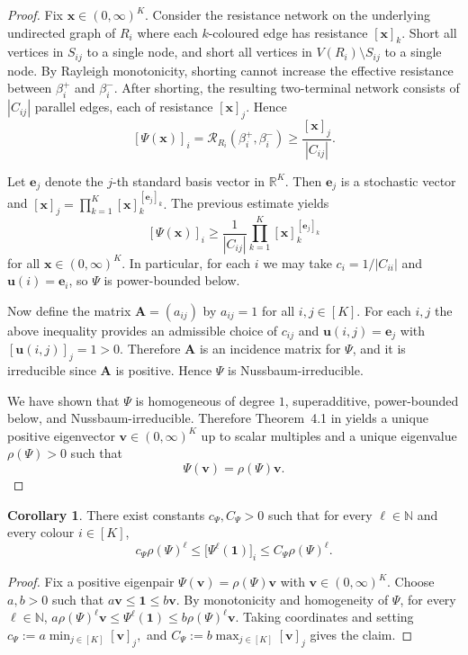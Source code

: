 \documentclass{article}
\theoremstyle{plain}
\theoremstyle{definition}
\newtheorem{corollary}[theorem]{Corollary}
\newcommand{\Reff}{\mathscr{R}}
\begin{document}
\begin{proof}
Fix $\mathbf x\in(0,\infty)^K$.
Consider the resistance network on the underlying undirected graph of $R_i$ where each $k$-coloured edge has resistance $[\mathbf x]_k$.
Short all vertices in $S_{ij}$ to a single node, and short all vertices in $V(R_i)\setminus S_{ij}$ to a single node.
By Rayleigh monotonicity, shorting cannot increase the effective resistance between $\beta_i^+$ and $\beta_i^-$.
After shorting, the resulting two-terminal network consists of $|C_{ij}|$ parallel edges, each of resistance $[\mathbf x]_j$.
Hence
\[
[\Psi(\mathbf x)]_i
=
\Reff_{R_i}(\beta_i^+,\beta_i^-)
\ge
\frac{[\mathbf x]_j}{|C_{ij}|}.
\]

Let $\mathbf e_j$ denote the $j$-th standard basis vector in $\mathbb R^K$.
Then $\mathbf e_j$ is a stochastic vector and
$
[\mathbf x]_j=\prod_{k=1}^K [\mathbf x]_k^{[\mathbf e_j]_k}.
$
The previous estimate yields
\[
[\Psi(\mathbf x)]_i
\ge
\frac{1}{|C_{ij}|}\prod_{k=1}^K [\mathbf x]_k^{[\mathbf e_j]_k}
\]
for all $\mathbf x\in(0,\infty)^K$.
In particular, for each $i$ we may take $c_i=1/|C_{ii}|$ and $\mathbf u(i)=\mathbf e_i$, so $\Psi$ is power-bounded below.

Now define the matrix $\mathbf A=(a_{ij})$ by $a_{ij}=1$ for all $i,j\in[K]$.
For each $i,j$ the above inequality provides an admissible choice of $c_{ij}$ and $\mathbf u(i,j)=\mathbf e_j$ with $[\mathbf u(i,j)]_j=1>0$.
Therefore $\mathbf A$ is an incidence matrix for $\Psi$, and it is irreducible since $\mathbf A$ is positive.
Hence $\Psi$ is Nussbaum-irreducible.

We have shown that $\Psi$ is homogeneous of degree $1$, superadditive, power-bounded below, and Nussbaum-irreducible.
Therefore Theorem~4.1 in \cite{nussbaum1986convexity} yields a unique positive eigenvector $\mathbf v\in(0,\infty)^K$ up to scalar multiples and a unique eigenvalue $\rho(\Psi)>0$ such that
\[
\Psi(\mathbf v)=\rho(\Psi)\mathbf v.
\]
\end{proof}

\begin{corollary}\label{lem:Psi_range}
There exist constants $c_{\Psi},C_{\Psi}>0$ such that for every $\ell\in\mathbb N$ and every colour $i\in[K]$,
\[
c_{\Psi} \rho(\Psi)^\ell
\le
\big[\Psi^\ell(\mathbf 1)\big]_i
\le
C_{\Psi} \rho(\Psi)^\ell.
\]
\end{corollary}

\begin{proof}
Fix a positive eigenpair $\Psi(\mathbf v)=\rho(\Psi)\mathbf v$ with $\mathbf v\in(0,\infty)^K$.
Choose $a,b>0$ such that $a\mathbf v\le \mathbf 1\le b\mathbf v$.
By monotonicity and homogeneity of $\Psi$, for every $\ell\in\mathbb N$,
$
a \rho(\Psi)^\ell \mathbf v
\le
\Psi^\ell(\mathbf 1)
\le
b \rho(\Psi)^\ell \mathbf v.
$
Taking coordinates and setting
$
c_{\Psi}:=a\min_{j\in[K]}[\mathbf v]_j,
$
and
$
C_{\Psi}:=b\max_{j\in[K]}[\mathbf v]_j
$
gives the claim.
\end{proof}
\end{document}
